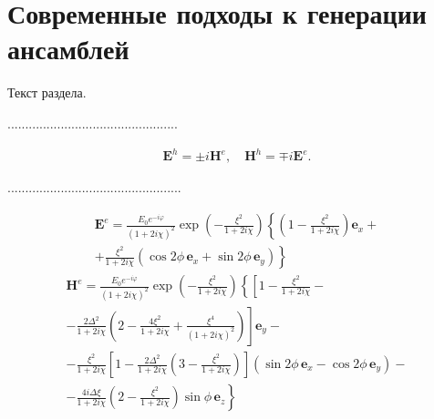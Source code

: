 \section{Современные подходы к генерации ансамблей}



Текст раздела.

................................................

\begin{equation}
 \begin{aligned}
  \mathbf E^h=\pm i\mathbf H^e,\quad\mathbf H^h=\mp i\mathbf E^e. %
 \end{aligned}
\end{equation}

.................................................

\begin{equation}            %
 \label{Eeexplicit}         %
 \begin{aligned}            %
  \mathbf E^e=\frac{E_0e^{-i\varphi}}{(1+2i\chi)^2}\exp\left(-\frac{\xi^2}      %
  {1+2i\chi}\right)\left\{\left(1-\frac{\xi^2}{1+2i\chi}\right)\mathbf          %
  e_x+\right.\\
  \left.+\frac{\xi^2}{1+2i\chi}(\cos2\phi\,\mathbf e_x+\sin2\phi\,\mathbf e_y)\right\}
 \end{aligned}
\end{equation}
\begin{equation}
 \label{Heexplicit}
 \begin{aligned}
  \mathbf H^e=\frac{E_0e^{-i\varphi}}{(1+2i\chi)^2}\exp\left(-\frac{\xi^2}
  {1+2i\chi}\right)\left\{\left[1-\frac{\xi^2}{1+2i\chi}-\right.\right.\\
  \left.-\frac{2\Delta^2}{1+2i\chi}\left(2-\frac{4\xi^2}
  {1+2i\chi}+\frac{\xi^4}{(1+2i\chi)^2}\right)\right]\mathbf e_y-\\
  -\frac{\xi^2}{1+2i\chi}\left[1-\frac{2\Delta^2}{1+2i\chi}\left(3-\frac{\xi^2}{1+2i\chi}\right)\right]
  (\sin2\phi\,\mathbf e_x-\cos2\phi\,\mathbf e_y)-\\
  \left.-\frac{4i\Delta\xi}{1+2i\chi}
  \left(2-\frac{\xi^2}{1+2i\chi}\right)\sin\phi\,\mathbf e_z\right\}
 \end{aligned}
\end{equation}

